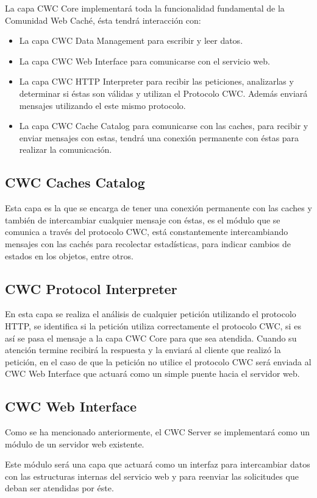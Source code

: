 La capa CWC Core implementará toda la funcionalidad fundamental de la Comunidad Web Caché, ésta tendrá interacción con:
\begin{itemize}
\item La capa CWC Data Management para escribir y leer datos.
\item La capa CWC Web Interface para comunicarse con el servicio web.
\item La capa CWC HTTP Interpreter para recibir las peticiones, analizarlas y determinar si éstas son válidas y utilizan el Protocolo CWC. Además enviará mensajes utilizando el este mismo protocolo.
\item La capa CWC Cache Catalog para comunicarse con las caches, para recibir y enviar mensajes con estas, tendrá una conexión permanente con éstas para realizar la comunicación.
\end{itemize}

\subsection{CWC Caches Catalog}
Esta capa es la que se encarga de tener una conexión permanente con las caches y también de intercambiar cualquier mensaje con éstas, es el módulo que se comunica a través del protocolo CWC, está constantemente intercambiando mensajes con las cachés para recolectar estadísticas, para indicar cambios de estados en los objetos, entre otros. 

\subsection{CWC Protocol Interpreter}
En esta capa se realiza el análisis de cualquier petición utilizando el protocolo HTTP,  se identifica si la petición utiliza correctamente el protocolo CWC, si es así se pasa el mensaje a la capa CWC Core para que sea atendida. Cuando su atención termine recibirá la respuesta y la enviará al cliente que realizó la petición, en el caso de que la petición no utilice el protocolo CWC será enviada al CWC Web Interface que actuará como un simple puente hacia el servidor web.

\subsection{CWC Web Interface}
Como se ha mencionado anteriormente, el CWC Server se implementará como un módulo de un servidor web existente. 

Este módulo será una capa que actuará como un interfaz para intercambiar datos con las estructuras internas del servicio web y para reenviar las solicitudes que deban ser atendidas por éste.

